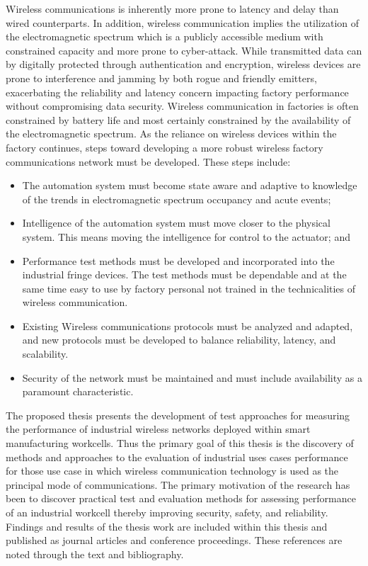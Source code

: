 Wireless communications is inherently more prone to latency and delay than wired counterparts.  In addition, wireless communication implies the utilization of the electromagnetic spectrum which is a publicly accessible medium with constrained capacity and more prone to cyber-attack.  While transmitted data can by digitally protected through authentication and encryption, wireless devices are prone to interference and jamming by both rogue and friendly emitters, exacerbating the reliability and latency concern impacting factory performance without compromising data security.  Wireless communication in factories is often constrained by battery life and most certainly constrained by the availability of the electromagnetic spectrum.   As the reliance on wireless devices within the factory continues, steps toward developing a more robust wireless factory communications network must be developed. These steps include:

\begin{itemize}
	\item The automation system must become state aware and adaptive to knowledge of the trends in electromagnetic spectrum occupancy and acute events; 
	\item Intelligence of the automation system must move closer to the physical system.  This means moving the intelligence for control to the actuator; and  
	\item Performance test methods must be developed and incorporated into the industrial fringe devices.  The test methods must be dependable and at the same time easy to use by factory personal not trained in the technicalities of wireless communication. 
	\item Existing Wireless communications protocols must be analyzed and adapted, and new protocols must be developed to balance reliability, latency, and scalability. 
	\item Security of the network must be maintained and must include availability as a paramount characteristic.
\end{itemize}

The proposed thesis presents the development of test approaches for measuring the performance of industrial wireless networks deployed within smart manufacturing workcells.  Thus the primary goal of this thesis is the discovery of methods and approaches to the evaluation of industrial uses cases performance for those use case in which wireless communication technology is used as the principal mode of communications.  The primary motivation of the research has been to discover practical test and evaluation methods for assessing performance of an industrial workcell thereby improving security, safety, and reliability.   Findings and results of the thesis work are included within this thesis and published as journal articles and conference proceedings.  These references are noted through the text and bibliography.  

